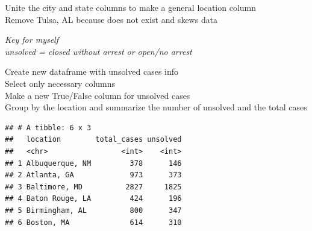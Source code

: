 \documentclass[]{article}
\newenvironment{Shaded}{\begin{snugshade}}{\end{snugshade}}
\newcommand{\DataTypeTok}[1]{\textcolor[rgb]{0.13,0.29,0.53}{#1}}
\newcommand{\KeywordTok}[1]{\textcolor[rgb]{0.13,0.29,0.53}{\textbf{#1}}}
\newcommand{\NormalTok}[1]{#1}
\newcommand{\OperatorTok}[1]{\textcolor[rgb]{0.81,0.36,0.00}{\textbf{#1}}}
\newcommand{\StringTok}[1]{\textcolor[rgb]{0.31,0.60,0.02}{#1}}
\begin{document}
Unite the city and state columns to make a general location column\\
Remove Tulsa, AL because does not exist and skews data

\begin{Shaded}
\end{Shaded}

\emph{Key for myself}\\
\emph{unsolved = closed without arrest or open/no arrest}

Create new dataframe with unsolved cases info\\
Select only necessary columns\\
Make a new True/False column for unsolved cases\\
Group by the location and summarize the number of unsolved and the total
cases

\begin{Shaded}
\end{Shaded}

\begin{verbatim}
## # A tibble: 6 x 3
##   location        total_cases unsolved
##   <chr>                 <int>    <int>
## 1 Albuquerque, NM         378      146
## 2 Atlanta, GA             973      373
## 3 Baltimore, MD          2827     1825
## 4 Baton Rouge, LA         424      196
## 5 Birmingham, AL          800      347
## 6 Boston, MA              614      310
\end{verbatim}
\end{document}
